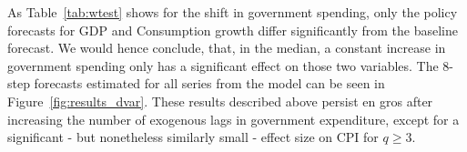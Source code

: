 %
%
%
%
%
%
%



As Table~\ref{tab:wtest} shows for the shift in government spending, only the policy forecasts for GDP and Consumption growth differ significantly from the baseline forecast. We would hence conclude, that, in the median, a constant increase in government spending only has a significant effect on those two variables. The 8-step forecasts estimated for all series from the model can be seen in Figure~\ref{fig:results_dvar}. These results described above persist en gros after increasing the number of exogenous lags in government expenditure, except for a significant - but nonetheless similarly small - effect size on CPI for $q \geq 3$. 

